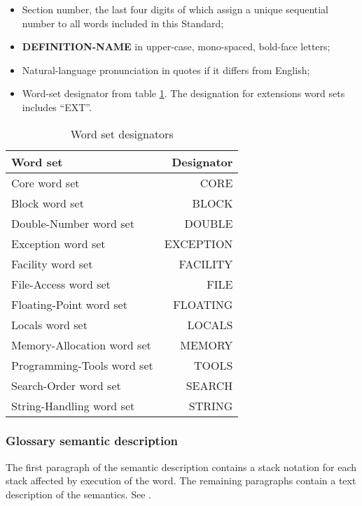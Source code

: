 \begin{itemize}
\item Section number, the last four digits of which assign a
	unique sequential number to all words included in this Standard;

\item \textbf{DEFINITION-NAME} in upper-case, mono-spaced,
	bold-face letters;

\item Natural-language pronunciation in quotes if it differs from English;

\item Word-set designator from table \ref{table:wordsets}.
	The designation for extensions word sets includes ``EXT''.
\end{itemize}

\begin{table}[ht]
  \begin{center}
	\caption{Word set designators}
	\label{table:wordsets}
	\begin{tabular}{lr}
	\hline\hline
	Word set & Designator \\
	\hline
	Core word set				& CORE		\\
	Block word set				& BLOCK		\\
	Double-Number word set		& DOUBLE	\\
	Exception word set			& EXCEPTION	\\
	Facility word set			& FACILITY	\\
	File-Access word set		& FILE		\\
	Floating-Point word set		& FLOATING	\\
	Locals word set				& LOCALS	\\
	Memory-Allocation word set	& MEMORY	\\
	Programming-Tools word set	& TOOLS		\\
	Search-Order word set		& SEARCH	\\
	String-Handling word set	& STRING	\\
	\hline\hline
	\end{tabular}
  \end{center}
\end{table}

\subsubsection{Glossary semantic description}

The first paragraph of the semantic description contains a stack
notation for each stack affected by execution of the word. The
remaining paragraphs contain a text description of the semantics.
See .


